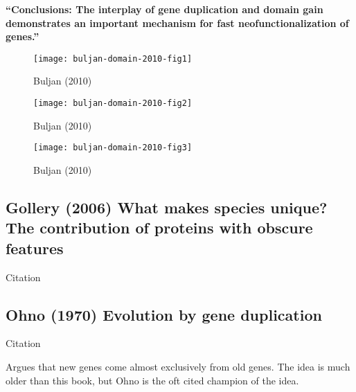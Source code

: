     \textbf{``Conclusions: The interplay of gene duplication and domain gain
        demonstrates an important mechanism for fast neofunctionalization of
        genes.''}

    \begin{figure}[h!]
        \centering
        \texttt{[image: buljan-domain-2010-fig1]}
        \caption{Buljan (2010)}
    \end{figure}

    \begin{figure}[h!]
        \centering
        \texttt{[image: buljan-domain-2010-fig2]}
        \caption{Buljan (2010)}
    \end{figure}

    \begin{figure}[h!]
        \centering
        \texttt{[image: buljan-domain-2010-fig3]}
        \caption{Buljan (2010)}
    \end{figure}
    \FloatBarrier
    
\subsection{Gollery (2006) What makes species unique? The contribution of
proteins with obscure features}

    Citation \cite{gollery_what_2006}

\subsection{Ohno (1970) Evolution by gene duplication}

    Citation \cite{ohno_evolution_1970}

    Argues that new genes come almost exclusively from old genes. The idea
    is much older than this book, but Ohno is the oft cited champion of the
    idea.
